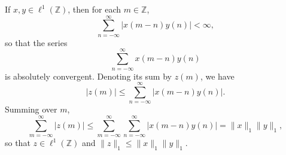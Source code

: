 If $x, y \in \ell^1(\mathbb{Z})$, then for each $m \in \mathbb{Z}$,
$$\sum_{n=-\infty}^{\infty} |x(m-n) y(n)| < \infty,$$
so that the series
$$\sum_{n=-\infty}^{\infty} x(m-n) y(n)$$
is absolutely convergent. Denoting its sum by $z(m)$, we have
$$|z(m)| \leq \sum_{n=-\infty}^{\infty} |x(m-n) y(n)|.$$
Summing over $m$,
$$\sum_{m=-\infty}^{\infty} |z(m)| \leq \sum_{m=-\infty}^{\infty} \sum_{n=-\infty}^{\infty} |x(m-n) y(n)| = \|x\|_1 \|y\|_1,$$
so that $z \in \ell^1(\mathbb{Z})$ and $\|z\|_1 \leq \|x\|_1 \|y\|_1$.
